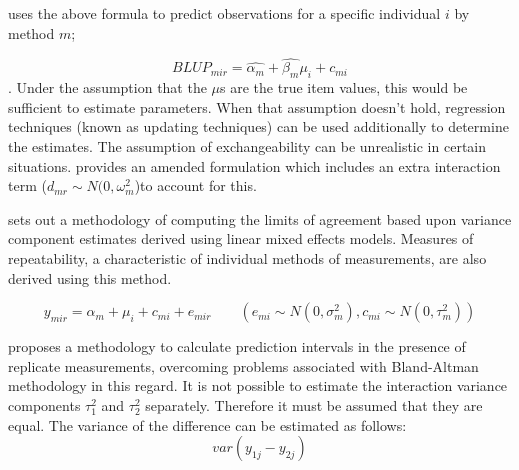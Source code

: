 \documentclass{report}
\begin{document}
	
	\citet{BXC2004} uses the above formula to predict observations for
	a specific individual $i$ by method $m$;
	
	\begin{equation}BLUP_{mir} = \hat{\alpha_{m}} + \hat{\beta_{m}}\mu_{i} +
	c_{mi} \end{equation}. Under the assumption that the $\mu$s are
	the true item values, this would be sufficient to estimate
	parameters. When that assumption doesn't hold, regression
	techniques (known as updating techniques) can be used additionally
	to determine the estimates. The assumption of exchangeability can
	be unrealistic in certain situations. \citet{BXC2004} provides an
	amended formulation which includes an extra interaction term ($
	d_{mr} \sim N(0,\omega^{2}_{m}$)to account for this.
	
	
	
	\citet{BXC2008} sets out a methodology of computing the limits of
	agreement based upon variance component estimates derived using
	linear mixed effects models. Measures of repeatability, a
	characteristic of individual methods of measurements, are also
	derived using this method.
	
	
	\begin{equation}
	y_{mir}  = \alpha_{m} + \mu_{i} + c_{mi} + e_{mir} \qquad ( e_{mi}
	\sim N(0,\sigma^{2}_{m}), c_{mi} \sim N(0,\tau^{2}_{m}))
	\end{equation}
	
	\citet{BXC2008} proposes a methodology to calculate prediction
	intervals in the presence of replicate measurements, overcoming
	problems associated with Bland-Altman methodology in this regard.
	It is not possible to estimate the interaction variance components
	$\tau^{2}_{1}$ and $\tau^{2}_{2}$ separately. Therefore it must be
	assumed that they are equal. The variance of the difference can be
	estimated as follows:
	\begin{equation}
	var(y_{1j}-y_{2j})
	\end{equation}
	
	
	
\end{document}
